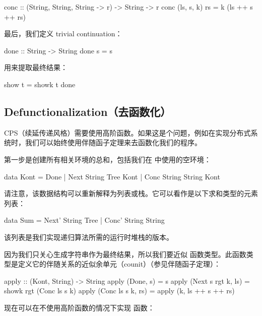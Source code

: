 \documentclass[DaoFP]{subfiles}
\begin{document}
    \begin{haskell}
        conc :: (String, String, String -> r) -> String -> r
        conc (ls, s, k) rs = k (ls ++ s ++ rs)
    \end{haskell}

    最后，我们定义 trivial continuation：

    \begin{haskell}
        done :: String -> String
        done s = s
    \end{haskell}

    用来提取最终结果：

    \begin{haskell}
        show t = showk t done
    \end{haskell}

    \subsection{Defunctionalization（去函数化）}

    CPS（续延传递风格）需要使用高阶函数。如果这是个问题，例如在实现分布式系统时，我们可以始终使用伴随函子定理来去函数化我们的程序。

    第一步是创建所有相关环境的总和，包括我们在  中使用的空环境：

    \begin{haskell}
        data Kont = Done
        | Next String Tree Kont
        | Conc String String Kont
    \end{haskell}

    请注意，该数据结构可以重新解释为列表或栈。它可以看作是以下求和类型的元素列表：

    \begin{haskell}
        data Sum = Next' String Tree  | Conc' String String
    \end{haskell}

    该列表是我们实现递归算法所需的运行时堆栈的版本。

    因为我们只关心生成字符串作为最终结果，所以我们要近似  函数类型。此函数类型是定义它的伴随关系的近似余单元（counit）（参见伴随函子定理）：

    \begin{haskell}
        apply :: (Kont, String) -> String
        apply (Done, s) = s
        apply (Next s rgt k, ls) = showk rgt (Conc ls s k)
        apply (Conc ls s k, rs) = apply (k, ls ++ s ++ rs)
    \end{haskell}

    现在可以在不使用高阶函数的情况下实现  函数：
\end{document}
